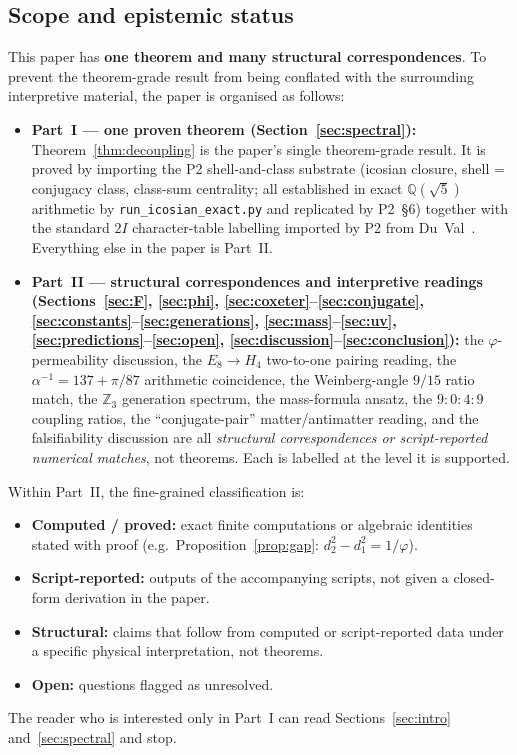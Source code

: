 \documentclass[12pt]{article}
\begin{document}
\subsection*{Scope and epistemic status}

This paper has \textbf{one theorem and many structural correspondences}. To prevent the theorem-grade result from being conflated with the surrounding interpretive material, the paper is organised as follows:

\begin{itemize}
    \item \textbf{Part~I --- one proven theorem (Section~\ref{sec:spectral}):} Theorem~\ref{thm:decoupling} is the paper's single theorem-grade result. It is proved by importing the P2 shell-and-class substrate (icosian closure, shell = conjugacy class, class-sum centrality; all established in exact $\mathbb{Q}(\sqrt{5})$ arithmetic by \texttt{run\_icosian\_exact.py} and replicated by P2~\S 6) together with the standard $2I$ character-table labelling imported by P2 from Du~Val~\citep[Ch.~3]{DuVal1964}. Everything else in the paper is Part~II.
    \item \textbf{Part~II --- structural correspondences and interpretive readings (Sections~\ref{sec:F}, \ref{sec:phi}, \ref{sec:coxeter}--\ref{sec:conjugate}, \ref{sec:constants}--\ref{sec:generations}, \ref{sec:mass}--\ref{sec:uv}, \ref{sec:predictions}--\ref{sec:open}, \ref{sec:discussion}--\ref{sec:conclusion}):} the $\varphi$-permeability discussion, the $E_8 \to H_4$ two-to-one pairing reading, the $\alpha^{-1} = 137 + \pi/87$ arithmetic coincidence, the Weinberg-angle $9/15$ ratio match, the $\mathbb{Z}_3$ generation spectrum, the mass-formula ansatz, the $9:0:4:9$ coupling ratios, the ``conjugate-pair'' matter/antimatter reading, and the falsifiability discussion are all \emph{structural correspondences or script-reported numerical matches}, not theorems. Each is labelled at the level it is supported.
\end{itemize}
Within Part~II, the fine-grained classification is:
\begin{itemize}
    \item \textbf{Computed / proved:} exact finite computations or algebraic identities stated with proof (e.g.\ Proposition~\ref{prop:gap}: $d_2^2 - d_1^2 = 1/\varphi$).
    \item \textbf{Script-reported:} outputs of the accompanying scripts, not given a closed-form derivation in the paper.
    \item \textbf{Structural:} claims that follow from computed or script-reported data under a specific physical interpretation, not theorems.
    \item \textbf{Open:} questions flagged as unresolved.
\end{itemize}
The reader who is interested only in Part~I can read Sections~\ref{sec:intro} and~\ref{sec:spectral} and stop.
\end{document}
